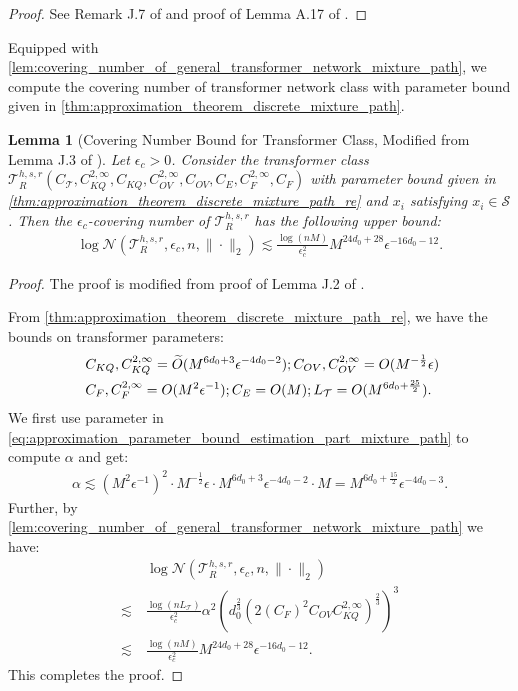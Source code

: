 \documentclass[12pt]{article}
\numberwithin{equation}{section}
\let\tilde\widetilde
\newcommand{\wt}{\widetilde}
\renewcommand{\tilde}{\wt}
\let\cite\citep
\theoremstyle{theoremstyle}
\newtheorem{lemma}{Lemma}[section]
\numberwithin{equation}{section}
\numberwithin{theorem}{section}
\numberwithin{proposition}{section}
\numberwithin{definition}{section}
\numberwithin{lemma}{section}
\numberwithin{assumption}{section}
\numberwithin{remark}{section}
\begin{document}
\begin{proof}
See Remark J.7 of \cite{hu2024statistical} and proof of Lemma A.17 of \cite{edelman2022inductivebiasesvariablecreation}.
\end{proof}

Equipped with \cref{lem:covering_number_of_general_transformer_network_mixture_path}, we compute the covering number of transformer network class with parameter bound given in \cref{thm:approximation_theorem_discrete_mixture_path}.

\begin{lemma}[Covering Number Bound for Transformer Class, Modified from Lemma J.3 of \cite{hu2024statistical}]\label{lem:covering_number_of_transformer_in_approximation_theory_mixture_path}
Let $\epsilon_c>0$. 
Consider the transformer class $\mathcal{T}^{h,s,r}_R(C_\mathcal{T},C^{2,\infty}_{KQ},C_{KQ},C^{2,\infty}_{OV},C_{OV},C_{E},C^{2,\infty}_{F},C_{F})$ with parameter bound given in \cref{thm:approximation_theorem_discrete_mixture_path_re} and $x_i$ satisfying $x_i\in \mathcal{S}$.
Then the $\epsilon_c$-covering number of $\mathcal{T}^{h,s,r}_R$ has the following upper bound:
\begin{align*}
    \log\mathcal{N}(\mathcal{T}^{h,s,r}_R,\epsilon_c,n,\|\cdot\|_2)\lesssim
    \frac{\log(nM)}{\epsilon_c^2}M^{24d_0+28}\epsilon^{-16d_0-12}.
\end{align*}
\end{lemma}

\begin{proof}
The proof is modified from proof of Lemma J.2 of \cite{hu2024statistical}.

From \cref{thm:approximation_theorem_discrete_mixture_path_re}, we have the bounds on transformer parameters:
\begin{align}\label{eq:approximation_parameter_bound_estimation_part_mixture_path}
    & ~C_{KQ},C^{2,\infty}_{KQ}=\tilde{O}(M^{6d_0+3}\epsilon^{-4d_0-2});C_{OV},C^{2,\infty}_{OV}=O(M^{-\frac{1}{2}}\epsilon) \notag\\
    & ~C_{F},C^{2,\infty}_{F}=O(M^2\epsilon^{-1});C_E=O(M);L_\mathcal{T}=O(M^{6d_0+\frac{25}{2}}).
\end{align}
We first use parameter in \eqref{eq:approximation_parameter_bound_estimation_part_mixture_path} to compute $\alpha$ and get:
\begin{align*}
\alpha \lesssim (M^2\epsilon^{-1})^2\cdot M^{-\frac{1}{2}}\epsilon\cdot M^{6d_0+3}\epsilon^{-4d_0-2}\cdot M=M^{6d_0+\frac{15}{2}}\epsilon^{-4d_0-3}.
\end{align*}
Further, by \cref{lem:covering_number_of_general_transformer_network_mixture_path} we have:
\begin{align*}
    & ~ \log\mathcal{N}(\mathcal{T}^{h,s,r}_R,\epsilon_c,n,\|\cdot\|_2) \\
    \lesssim & ~
    \frac{\log(nL_\mathcal{T})}{\epsilon_c^2}\alpha^2(d_0^\frac{2}{3}(2(C_F)^2C_{OV}C_{KQ}^{2,\infty})^\frac{2}{3})^3 \\
    \lesssim & ~
    \frac{\log(nM)}{\epsilon_c^2}M^{24d_0+28}\epsilon^{-16d_0-12}.
\end{align*}
This completes the proof.
\end{proof}
\end{document}
